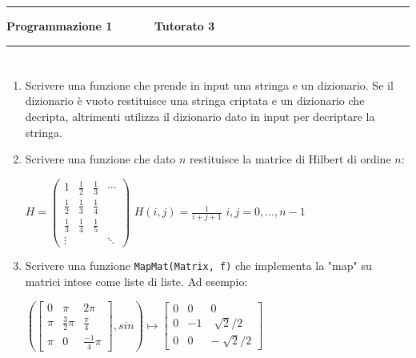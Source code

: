 \documentclass[11pt,a4]{article}
\begin{document}
\thispagestyle{empty}
\hrule
\begin{center}
   {\Large {\bf Programmazione 1 \hspace{3cm} $\quad \quad \quad$ Tutorato 3}}
\end{center}

\hrule

\section*{}

\begin{enumerate}

\item Scrivere una funzione che prende in input una stringa e un dizionario. Se il dizionario è vuoto restituisce una stringa criptata e un dizionario che decripta, altrimenti utilizza il dizionario dato in input per decriptare la stringa.


\item Scrivere una funzione che dato $n$ restituisce la matrice di Hilbert di ordine $n$:

\begin{center}
$H=\begin{pmatrix}
       1      & \frac{1}{2} & \frac{1}{3} & \cdots \\[1ex] 
  \frac{1}{2} & \frac{1}{3} & \frac{1}{4} &  \\[1ex]
  \frac{1}{3} & \frac{1}{4} & \frac{1}{5} &  \\
    \vdots    &             &             & \ddots 
\end{pmatrix}$
$H(i,j)=\frac{1}{i+j+1}$ $i,j=0,\dots,n-1$
\end{center}

\item Scrivere una funzione {\tt MapMat(Matrix, f)} che implementa la "map" su matrici intese come liste di liste. 
Ad esempio:\\
\begin{center}
$
\left(
\begin{bmatrix} 
0 & \pi & 2\pi\\[4pt]
\pi & \frac{3}{2}\pi & \frac{\pi}{4} \\[4pt]
\pi & 0 & \frac{-1}{4}\pi\end{bmatrix}, sin \right) \longmapsto 
\begin{bmatrix} 
0 & 0 & 0\\[4pt]
0 & -1 & \sqrt[]{2}/2 \\[4pt]
0 & 0 & -\sqrt[]{2}/2\end{bmatrix}
$
\end{center}


\end{enumerate}
\end{document}
